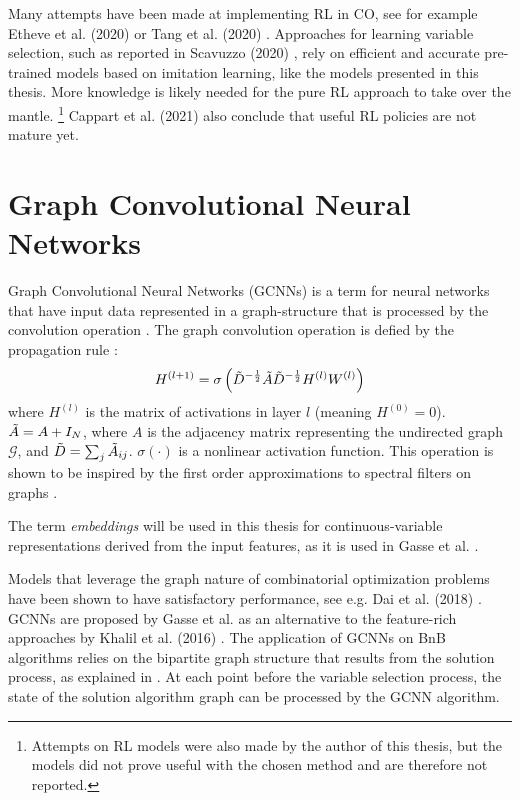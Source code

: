 Many attempts have been made at implementing \gls{RL} in \gls{CO}, see for example Etheve et al. (2020) \cite{etheve2020reinforcement} or Tang et al. (2020) \cite{tang2020reinforcement}. Approaches for learning variable selection, such as reported in Scavuzzo (2020) \cite{scavuzzo2020learning}, rely on efficient and accurate pre-trained models based on imitation learning, like the models presented in this thesis. More knowledge is likely needed for the pure \gls{RL} approach to take over the mantle.
\footnote{Attempts on \gls{RL} models were also made by the author of this thesis, but the models did not prove useful with the chosen method and are therefore not reported.}
Cappart et al. (2021) \cite{cappart2021combinatorial} also conclude that useful \gls{RL} policies are not mature yet. 






\section{Graph Convolutional Neural Networks }

Graph Convolutional Neural Networks (\gls{GCNN}s) is a term for neural networks that have input data represented in a graph-structure that is processed by the convolution operation \cite{kipf2016semisupervised}. The graph convolution operation is defied by the propagation rule \cite{kipf2016semisupervised}:
\begin{equation}
    H^{(l+1)} = \sigma \left( \Tilde{D}^{-\frac{1}{2}} \Tilde{A} \Tilde{D}^{-\frac{1}{2}} H^{(l)}W^{(l)}\right)
\end{equation}
where $H^{(l)}$ is the matrix of activations in layer $l$ (meaning $H^{(0)} = 0$). $\Tilde{A} = A + I_N$, where $A$ is the adjacency matrix representing the undirected graph $\mathcal{G}$, and $\Tilde{D} = \sum_j \Tilde{A}_{i j}$. $\sigma( \cdot) $ is a nonlinear activation function.
This operation is shown to be inspired by the first order approximations to spectral filters on graphs \cite{kipf2016semisupervised}.

The term \textit{embeddings} will be used in this thesis for continuous-variable representations derived from the input features, as it is used in Gasse et al. \cite{gasse2019exact}. 

Models that leverage the graph nature of combinatorial optimization problems have been shown to have satisfactory performance, see e.g. Dai et al. (2018) \cite{dai2018learning}. 
\gls{GCNN}s are proposed by Gasse et al. \cite{gasse2019exact} as an alternative to the feature-rich approaches by Khalil et al. (2016) \cite{khalil2016learning}. 
The application of \gls{GCNN}s on \gls{BnB} algorithms relies on the bipartite graph structure that results from the solution process, as explained in . At each point before the variable selection process, the state of the solution algorithm graph can be processed by the \gls{GCNN} algorithm. 

